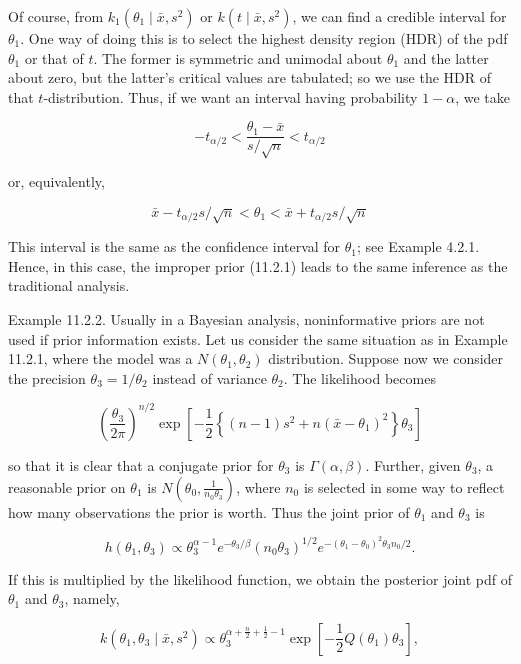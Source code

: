 Of course, from $k_{1}\left(\theta_{1} \mid \bar{x}, s^{2}\right)$ or $k\left(t \mid \bar{x}, s^{2}\right)$, we can find a credible interval for $\theta_{1}$. One way of doing this is to select the highest density region (HDR) of the pdf $\theta_{1}$ or that of $t$. The former is symmetric and unimodal about $\theta_{1}$ and the latter about zero, but the latter's critical values are tabulated; so we use the HDR of that $t$-distribution. Thus, if we want an interval having probability $1-\alpha$, we take

$$
-t_{\alpha / 2}<\frac{\theta_{1}-\bar{x}}{s / \sqrt{n}}<t_{\alpha / 2}
$$

or, equivalently,

$$
\bar{x}-t_{\alpha / 2} s / \sqrt{n}<\theta_{1}<\bar{x}+t_{\alpha / 2} s / \sqrt{n}
$$

This interval is the same as the confidence interval for $\theta_{1}$; see Example 4.2.1. Hence, in this case, the improper prior (11.2.1) leads to the same inference as the traditional analysis.

Example 11.2.2. Usually in a Bayesian analysis, noninformative priors are not used if prior information exists. Let us consider the same situation as in Example 11.2.1, where the model was a $N\left(\theta_{1}, \theta_{2}\right)$ distribution. Suppose now we consider the precision $\theta_{3}=1 / \theta_{2}$ instead of variance $\theta_{2}$. The likelihood becomes

$$
\left(\frac{\theta_{3}}{2 \pi}\right)^{n / 2} \exp \left[-\frac{1}{2}\left\{(n-1) s^{2}+n\left(\bar{x}-\theta_{1}\right)^{2}\right\} \theta_{3}\right]
$$

so that it is clear that a conjugate prior for $\theta_{3}$ is $\Gamma(\alpha, \beta)$. Further, given $\theta_{3}$, a reasonable prior on $\theta_{1}$ is $N\left(\theta_{0}, \frac{1}{n_{0} \theta_{3}}\right)$, where $n_{0}$ is selected in some way to reflect how many observations the prior is worth. Thus the joint prior of $\theta_{1}$ and $\theta_{3}$ is

$$
h\left(\theta_{1}, \theta_{3}\right) \propto \theta_{3}^{\alpha-1} e^{-\theta_{3} / \beta}\left(n_{0} \theta_{3}\right)^{1 / 2} e^{-\left(\theta_{1}-\theta_{0}\right)^{2} \theta_{3} n_{0} / 2} .
$$

If this is multiplied by the likelihood function, we obtain the posterior joint pdf of $\theta_{1}$ and $\theta_{3}$, namely,

$$
k\left(\theta_{1}, \theta_{3} \mid \bar{x}, s^{2}\right) \propto \theta_{3}^{\alpha+\frac{n}{2}+\frac{1}{2}-1} \exp \left[-\frac{1}{2} Q\left(\theta_{1}\right) \theta_{3}\right],
$$

